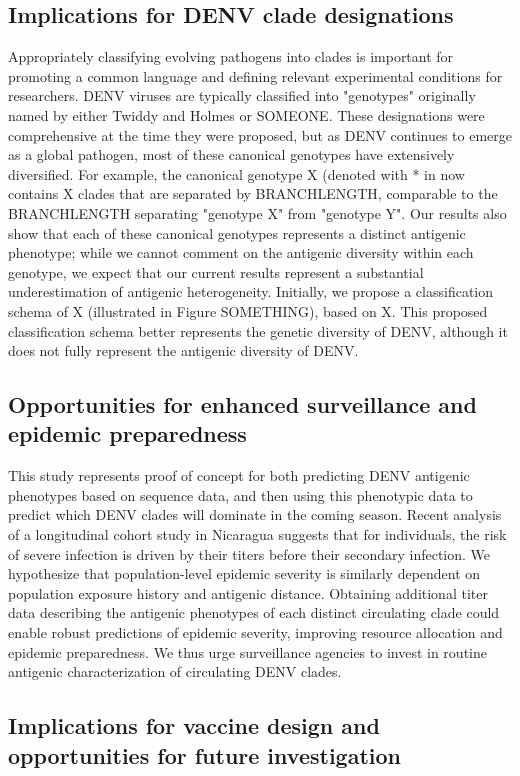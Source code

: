 \documentclass[11pt,oneside,letterpaper]{article}
\begin{document}
\subsection*{Implications for DENV clade designations}
Appropriately classifying evolving pathogens into clades is important for promoting a common language and defining relevant experimental conditions for researchers.
DENV viruses are typically classified into "genotypes" originally named by either Twiddy and Holmes or SOMEONE.
These designations were comprehensive at the time they were proposed, but as DENV continues to emerge as a global pathogen, most of these canonical genotypes have extensively diversified.
For example, the canonical genotype X (denoted with * in
now contains X clades that are separated by BRANCHLENGTH, comparable to the BRANCHLENGTH separating "genotype X" from "genotype Y".
Our results also show that each of these canonical genotypes represents a distinct antigenic phenotype; while we cannot comment on the antigenic diversity within each genotype, we expect that our current results represent a substantial underestimation of antigenic heterogeneity.
Initially, we propose a classification schema of X (illustrated in Figure SOMETHING), based on X.
This proposed classification schema better represents the genetic diversity of DENV, although it does not fully represent the antigenic diversity of DENV.

\subsection*{Opportunities for enhanced surveillance and epidemic preparedness}
This study represents proof of concept for both predicting DENV antigenic phenotypes based on sequence data, and then using this phenotypic data to predict which DENV clades will dominate in the coming season.
Recent analysis of a longitudinal cohort study in Nicaragua suggests that for individuals, the risk of severe infection is driven by their titers before their secondary infection.
We hypothesize that population-level epidemic severity is similarly dependent on population exposure history and antigenic distance.
Obtaining additional titer data describing the antigenic phenotypes of each distinct circulating clade could enable robust predictions of epidemic severity, improving resource allocation and epidemic preparedness.
We thus urge surveillance agencies to invest in routine antigenic characterization of circulating DENV clades.

\subsection*{Implications for vaccine design and opportunities for future investigation}
\end{document}
